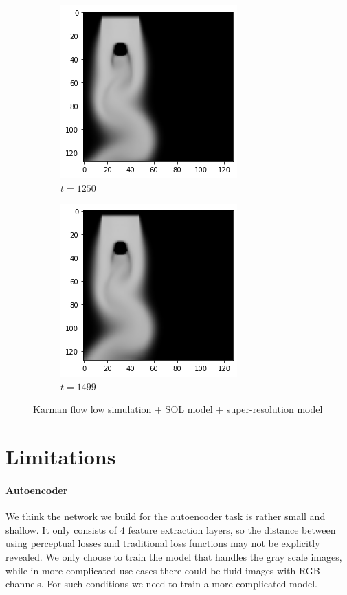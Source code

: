 \documentclass[a4paper,12pt,twoside]{report}
\begin{document}
\begin{figure}
\begin{subfigure}{0.18\textwidth}
	\end{subfigure}
	\begin{subfigure}{0.18\textwidth}
		\centering
		\includegraphics[scale=0.3]{timecost/low1250.png}
		\caption{$t=1250$}
	\end{subfigure}
	\begin{subfigure}{0.18\textwidth}
		\centering
		\includegraphics[scale=0.3]{timecost/low1499.png}
		\caption{$t=1499$}
	\end{subfigure}
	\caption{Karman flow low simulation + SOL model + super-resolution model}
	\label{timecost out}
\end{figure}

\section{Limitations}
\paragraph{Autoencoder} We think the network we build for the autoencoder task is rather small and shallow. It only consists of 4 feature extraction layers, so the distance between using perceptual losses and traditional loss functions may not be explicitly revealed. We only choose to train the model that handles the gray scale images, while in more complicated use cases there could be fluid images with RGB channels. For such conditions we need to train a more complicated model.
\end{document}

